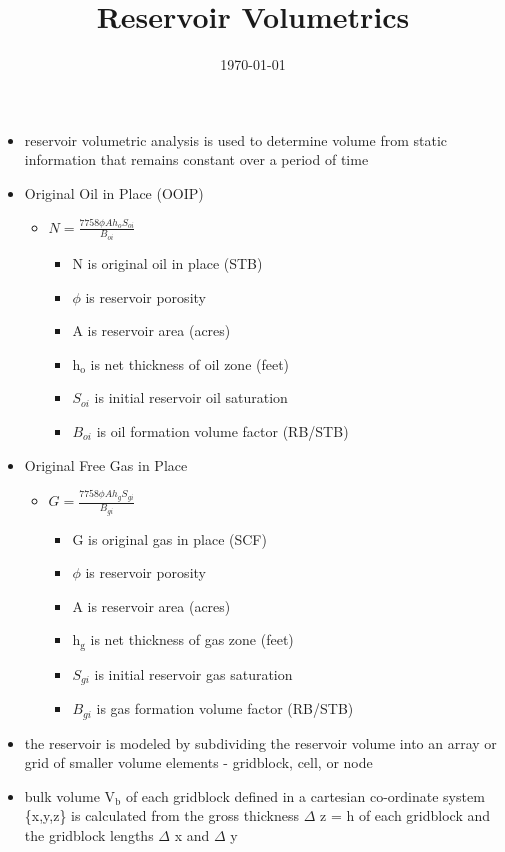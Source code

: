 \documentclass[11pt]{article}
\date{\today}
\title{Reservoir Volumetrics}
\begin{document}
\maketitle
\tableofcontents

\begin{itemize}
\item reservoir volumetric analysis is used to determine volume from static information that remains constant over a period of time
\item Original Oil in Place (OOIP)
\begin{itemize}
\item \(N = \frac{7758 \phi A h_o S_{oi}}{B_{oi}}\)
\begin{itemize}
\item N is original oil in place (STB)
\item \(\phi\) is reservoir porosity
\item A is reservoir area (acres)
\item h\(_{\text{o}}\) is net thickness of oil zone (feet)
\item \(S_{oi}\) is initial reservoir oil saturation
\item \(B_{oi}\) is oil formation volume factor (RB/STB)
\end{itemize}
\end{itemize}
\item Original Free Gas in Place
\begin{itemize}
\item \(G = \frac{7758 \phi A h_g S_{gi}}{B_{gi}}\)
\begin{itemize}
\item G is original gas in place (SCF)
\item \(\phi\) is reservoir porosity
\item A is reservoir area (acres)
\item h\(_{\text{g}}\) is net thickness of gas zone (feet)
\item \(S_{gi}\) is initial reservoir gas saturation
\item \(B_{gi}\) is gas formation volume factor (RB/STB)
\end{itemize}
\end{itemize}
\item the reservoir is modeled by subdividing the reservoir volume into an array or grid of smaller volume elements - gridblock, cell, or node
\item bulk volume V\(_{\text{b}}\) of each gridblock defined in a cartesian co-ordinate system \{x,y,z\} is calculated from the gross thickness \(\Delta\) z = h of each gridblock and the gridblock lengths \(\Delta\) x and \(\Delta\) y

\end{itemize}
\end{document}

